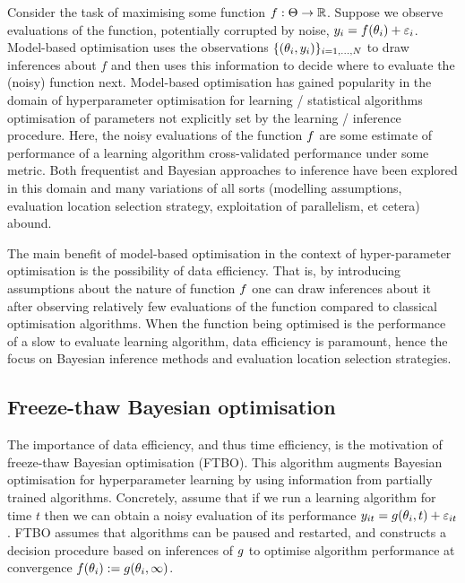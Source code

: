 \documentclass{article} %
\begin{document}
Consider the task of maximising some function $f : \Theta \to \mathbb{R}$.
Suppose we observe evaluations of the function, potentially corrupted by noise, $y_i = f(\theta_i) + \varepsilon_i$.
Model-based optimisation uses the observations $\{(\theta_i, y_i)\}_{i=1,\dots,N}$ to draw inferences about $f$ and then uses this information to decide where to evaluate the (noisy) function next.
Model-based optimisation has gained popularity in the domain of hyperparameter optimisation for learning / statistical algorithms \ie optimisation of parameters not explicitly set by the learning / inference procedure.
Here, the noisy evaluations of the function $f$ are some estimate of performance of a learning algorithm \eg cross-validated performance under some metric.
Both frequentist and Bayesian approaches to inference have been explored in this domain and many variations of all sorts (modelling assumptions, evaluation location selection strategy, exploitation of parallelism, et cetera) abound.

The main benefit of model-based optimisation in the context of hyper-parameter optimisation is the possibility of data efficiency.
That is, by introducing assumptions about the nature of function $f$ one can draw inferences about it after observing relatively few evaluations of the function compared to classical optimisation algorithms.
When the function being optimised is the performance of a slow to evaluate learning algorithm, data efficiency is paramount, hence the focus on Bayesian inference methods and evaluation location selection strategies.

\subsection{Freeze-thaw Bayesian optimisation}

The importance of data efficiency, and thus time efficiency, is the motivation of freeze-thaw Bayesian optimisation (FTBO).
This algorithm augments Bayesian optimisation for hyperparameter learning by using information from partially trained algorithms.
Concretely, assume that if we run a learning algorithm for time $t$ then we can obtain a noisy evaluation of its performance $y_{it} = g(\theta_i, t) + \varepsilon_{it}$.
FTBO assumes that algorithms can be paused and restarted, and constructs a decision procedure based on inferences of $g$ to optimise algorithm performance at convergence \ie $f(\theta_i) := g(\theta_i, \infty)$.
\end{document}
